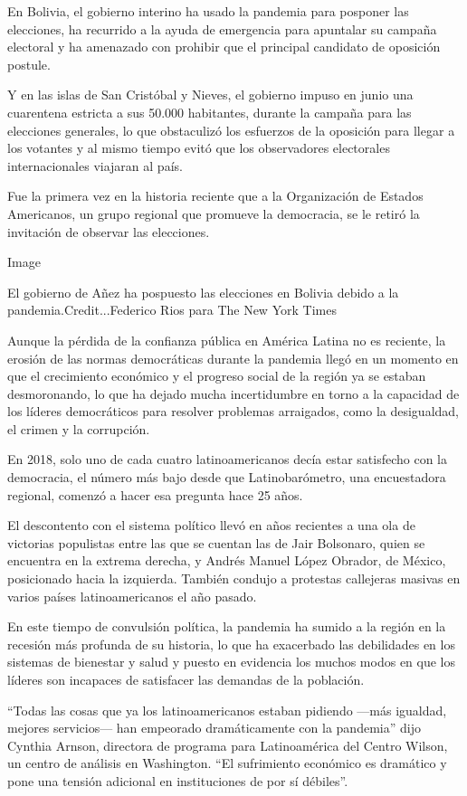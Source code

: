 En Bolivia, el gobierno interino ha usado la pandemia para posponer las
elecciones, ha recurrido a la ayuda de emergencia para apuntalar su
campaña electoral y ha amenazado con prohibir que el principal candidato
de oposición postule.

Y en las islas de San Cristóbal y Nieves, el gobierno impuso en junio
una cuarentena estricta a sus 50.000 habitantes, durante la campaña para
las elecciones generales, lo que obstaculizó los esfuerzos de la
oposición para llegar a los votantes y al mismo tiempo evitó que los
observadores electorales internacionales viajaran al país.

Fue la primera vez en la historia reciente que a la Organización de
Estados Americanos, un grupo regional que promueve la democracia, se le
retiró la invitación de observar las elecciones.

Image

El gobierno de Añez ha pospuesto las elecciones en Bolivia debido a la
pandemia.Credit...Federico Rios para The New York Times

Aunque la pérdida de la confianza pública en América Latina no es
reciente, la erosión de las normas democráticas durante la pandemia
llegó en un momento en que el crecimiento económico y el progreso social
de la región ya se estaban desmoronando, lo que ha dejado mucha
incertidumbre en torno a la capacidad de los líderes democráticos para
resolver problemas arraigados, como la desigualdad, el crimen y la
corrupción.

En 2018, solo uno de cada cuatro latinoamericanos decía estar satisfecho
con la democracia, el número más bajo desde que Latinobarómetro, una
encuestadora regional, comenzó a hacer esa pregunta hace 25 años.

El descontento con el sistema político llevó en años recientes a una ola
de victorias populistas entre las que se cuentan las de Jair Bolsonaro,
quien se encuentra en la extrema derecha, y Andrés Manuel López Obrador,
de México, posicionado hacia la izquierda. También condujo a protestas
callejeras masivas en varios países latinoamericanos el año pasado.

En este tiempo de convulsión política, la pandemia ha sumido a la región
en la recesión más profunda de su historia, lo que ha exacerbado las
debilidades en los sistemas de bienestar y salud y puesto en evidencia
los muchos modos en que los líderes son incapaces de satisfacer las
demandas de la población.

``Todas las cosas que ya los latinoamericanos estaban pidiendo ---más
igualdad, mejores servicios--- han empeorado dramáticamente con la
pandemia'' dijo Cynthia Arnson, directora de programa para Latinoamérica
del Centro Wilson, un centro de análisis en Washington. ``El sufrimiento
económico es dramático y pone una tensión adicional en instituciones de
por sí débiles''.

